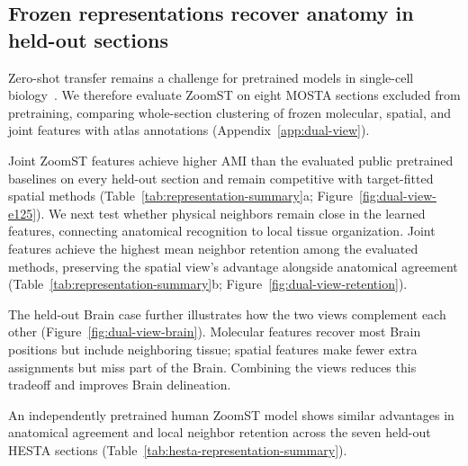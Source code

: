 \subsection{Frozen representations recover anatomy in held-out sections}
\label{sec:dual-view-identification}

Zero-shot transfer remains a challenge for pretrained models in single-cell biology~\citep{kedzierska2025zeroshot}. We therefore evaluate ZoomST on eight MOSTA sections excluded from pretraining, comparing whole-section clustering of frozen molecular, spatial, and joint features with atlas annotations (Appendix~\ref{app:dual-view}).

Joint ZoomST features achieve higher AMI than the evaluated public pretrained baselines on every held-out section and remain competitive with target-fitted spatial methods (Table~\ref{tab:representation-summary}a; Figure~\ref{fig:dual-view-e125}). We next test whether physical neighbors remain close in the learned features, connecting anatomical recognition to local tissue organization. Joint features achieve the highest mean neighbor retention among the evaluated methods, preserving the spatial view's advantage alongside anatomical agreement (Table~\ref{tab:representation-summary}b; Figure~\ref{fig:dual-view-retention}).

The held-out Brain case further illustrates how the two views complement each other (Figure~\ref{fig:dual-view-brain}). Molecular features recover most Brain positions but include neighboring tissue; spatial features make fewer extra assignments but miss part of the Brain. Combining the views reduces this tradeoff and improves Brain delineation.

An independently pretrained human ZoomST model shows similar advantages in anatomical agreement and local neighbor retention across the seven held-out HESTA sections (Table~\ref{tab:hesta-representation-summary}).



\begin{table}[!tbp]
\centering
\caption{\textbf{Tissue mapping and neighbor retention on seven held-out HESTA sections.} Readouts, abbreviations, and highlighting follow Table~\ref{tab:representation-summary}. Protocols: Appendix~\ref{app:dual-view}.}
\label{tab:hesta-representation-summary}
\begin{minipage}{0.90\linewidth}
\begingroup
\fontsize{8}{9}\selectfont
\setlength{\tabcolsep}{1.2pt}
\setlength{\aboverulesep}{0.2ex}
\setlength{\belowrulesep}{0.3ex}
\renewcommand{\arraystretch}{1.04}

\endgroup
\end{minipage}
\end{table}
